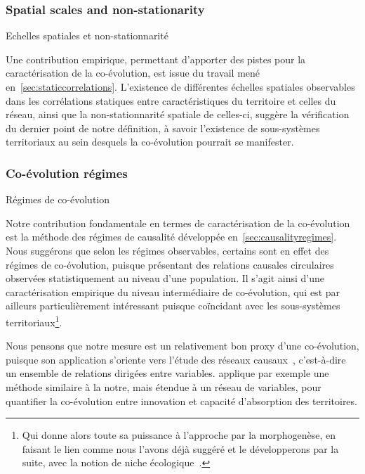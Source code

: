 \subsubsection{Spatial scales and non-stationarity}{Echelles spatiales et non-stationnarité}

Une contribution empirique, permettant d'apporter des pistes pour la caractérisation de la co-évolution, est issue du travail mené en~\ref{sec:staticcorrelations}. L'existence de différentes échelles spatiales observables dans les corrélations statiques entre caractéristiques du territoire et celles du réseau, ainsi que la non-stationnarité spatiale de celles-ci, suggère la vérification du dernier point de notre définition, à savoir l'existence de sous-systèmes territoriaux au sein desquels la co-évolution pourrait se manifester.




\subsubsection{Co-évolution régimes}{Régimes de co-évolution}

Notre contribution fondamentale en termes de caractérisation de la co-évolution est la méthode des régimes de causalité développée en~\ref{sec:causalityregimes}. Nous suggérons que selon les régimes observables, certains sont en effet des régimes de co-évolution, puisque présentant des relations causales circulaires observées statistiquement au niveau d'une population. Il s'agit ainsi d'une caractérisation empirique du niveau intermédiaire de co-évolution, qui est par ailleurs particulièrement intéressant puisque coïncidant avec les sous-systèmes territoriaux\footnote{Qui donne alors toute sa puissance à l'approche par la morphogenèse, en faisant le lien comme nous l'avons déjà suggéré et le développerons par la suite, avec la notion de niche écologique~\cite{holland2012signals}.}.

Nous pensons que notre mesure est un relativement bon proxy d'une co-évolution, puisque son application s'oriente vers l'étude des réseaux causaux~\cite{seth2005causal}, c'est-à-dire un ensemble de relations dirigées entre variables. \cite{castellacci2013dynamics} applique par exemple une méthode similaire à la notre, mais étendue à un réseau de variables, pour quantifier la co-évolution entre innovation et capacité d'absorption des territoires.

